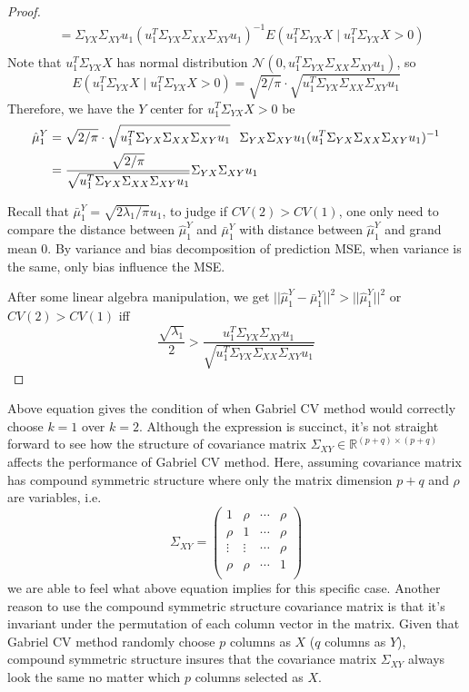 \documentclass[12pt]{article}
\begin{document}
\begin{proof}
\begin{align}
 		      & =  \Sigma_{YX}\Sigma_{XY}u_1 (u^T_1\Sigma_{YX} \Sigma_{XX} \Sigma_{XY} u_1)^{-1} E(u^T_1\Sigma_{YX}X \mid u^T_1\Sigma_{YX}X>0) \\ \nonumber
\end{align}
Note that $u^T_1\Sigma_{YX}X$ has normal distribution $\mathcal{N} \left( 0, u^T_1\Sigma_{YX} \Sigma_{XX} \Sigma_{XY} u_1\right)$, so
\[
E(u^T_1\Sigma_{YX}X \mid u^T_1\Sigma_{YX}X>0) = \sqrt{2/\pi}\cdot\sqrt{u^T_1\Sigma_{YX} \Sigma_{XX} \Sigma_{XY} u_1}
\]
Therefore, we have the $Y$ center for $u^T_1\Sigma_{YX}X>0$ be
\begin{align*}
\hat{\mu}^Y_1 &= \sqrt{2/\pi}\cdot\sqrt{u^T_1\Sigma_{YX} \Sigma_{XX} \Sigma_{XY} u_1} \hspace{0.1in} \Sigma_{YX}\Sigma_{XY}u_1 (u^T_1\Sigma_{YX} \Sigma_{XX} \Sigma_{XY} u_1)^{-1} \\
&=\frac{\sqrt{2/\pi}}{\sqrt{u^T_1\Sigma_{YX} \Sigma_{XX} \Sigma_{XY} u_1}} \Sigma_{YX}\Sigma_{XY}u_1
\end{align*} 
 
Recall that $\bar{\mu}^Y_1 =\sqrt{2 \lambda_1/\pi}u_1$, to judge if $CV(2) > CV(1)$, one only need to compare the distance between  $\hat{\mu}^Y_1$  and  $\bar{\mu}^Y_1$ with distance between  $\hat{\mu}^Y_1$ and grand mean $0$. By variance and bias decomposition of prediction MSE, when variance is the same, only bias influence the MSE. 

After some linear algebra manipulation, we get
$||\hat{\mu}^Y_1 - \bar{\mu}^Y_1||^2 > ||\hat{\mu}^Y_1||^2$ or $CV(2) > CV(1)$ iff
\[
 \frac{\sqrt{\lambda_1}}{2} > \frac{u^T_1\Sigma_{YX}\Sigma_{XY}u_1}{\sqrt{u^T_1\Sigma_{YX} \Sigma_{XX} \Sigma_{XY} u_1}} 
\]
\end{proof}

Above equation gives the condition of when Gabriel CV method would correctly choose $k=1$ over $k=2$. Although the expression is succinct, it's not straight forward to see how the structure of covariance matrix $\Sigma_{XY} \in \mathbb{R}^{(p+q) \times (p+q)}$ affects the performance of Gabriel CV method. Here, assuming covariance matrix has compound symmetric structure where only the matrix dimension $p+q$ and $\rho$ are variables, i.e. $$\Sigma_{XY} = \begin{pmatrix}
1 & \rho & \cdots & \rho \\
\rho & 1 & \cdots & \rho \\
\vdots & \vdots & \cdots & \rho \\
\rho& \rho & \cdots & 1 \\
\end{pmatrix}
$$
we are able to feel what above equation implies for this specific case. Another reason to use the compound symmetric structure covariance matrix is that it's invariant under the permutation of each column vector in the matrix. Given that Gabriel CV method randomly choose $p$ columns as $X$ ($q$ columns as $Y$), compound symmetric structure insures that the covariance matrix $\Sigma_{XY}$ always look the same no matter which $p$ columns selected as $X$.  
\end{document}
